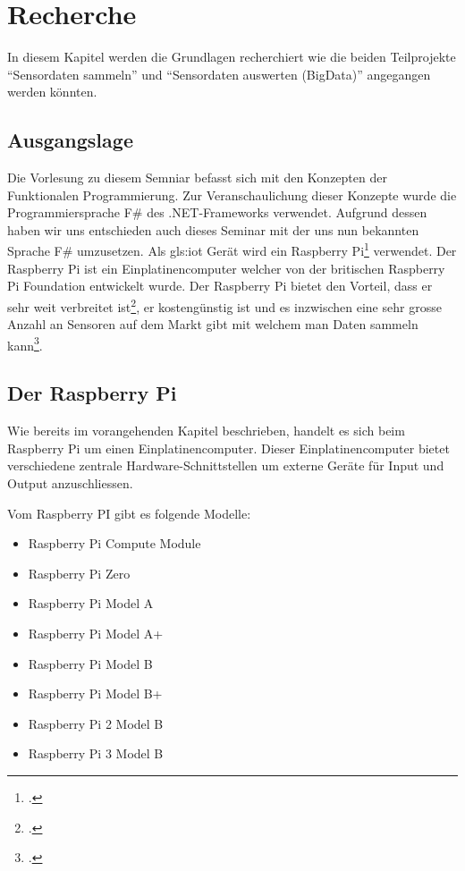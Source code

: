 
\chapter{Recherche}
In diesem Kapitel werden die Grundlagen recherchiert wie die beiden Teilprojekte "`Sensordaten sammeln"' und "`Sensordaten auswerten (BigData)"' angegangen werden könnten.

\section{Ausgangslage}
Die Vorlesung zu diesem Semniar befasst sich mit den Konzepten der Funktionalen Programmierung. Zur Veranschaulichung dieser Konzepte wurde die Programmiersprache F\# des .NET-Frameworks verwendet. Aufgrund dessen haben wir uns entschieden auch dieses Seminar mit der uns nun bekannten Sprache F\# umzusetzen. Als \Gls{gls:iot} Gerät wird ein Raspberry Pi\footcite{Raspberry_Pi_2016-04-24} verwendet. Der Raspberry Pi ist ein Einplatinencomputer welcher von der britischen Raspberry Pi Foundation entwickelt wurde. Der Raspberry Pi bietet den Vorteil, dass er sehr weit verbreitet ist\footcite{Raspberry_Pi_Erfolgsgeschichte_2016-04-24}, er kostengünstig ist und es inzwischen eine sehr grosse Anzahl an Sensoren auf dem Markt gibt mit welchem man Daten sammeln kann\footcite{Raspberry_Pi_Sensor_2016-04-24}.

\section{Der Raspberry Pi}
\label{sec:recherche:rpi}
Wie bereits im vorangehenden Kapitel beschrieben, handelt es sich beim Raspberry Pi um einen Einplatinencomputer. Dieser Einplatinencomputer bietet verschiedene zentrale Hardware-Schnittstellen um externe Geräte für Input und Output anzuschliessen.

Vom Raspberry PI gibt es folgende Modelle:
\begin{itemize}
\item Raspberry Pi Compute Module
\item Raspberry Pi Zero
\item Raspberry Pi Model A
\item Raspberry Pi Model A+
\item Raspberry Pi Model B
\item Raspberry Pi Model B+
\item Raspberry Pi 2 Model B
\item Raspberry Pi 3 Model B
\end{itemize}

